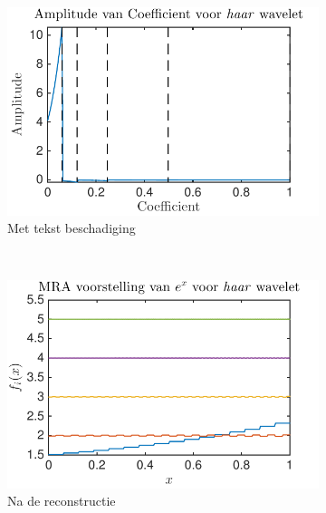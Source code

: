 \begin{figure}
\begin{subfigure}[b]{0.45\textwidth}
        \includegraphics[width=\textwidth]{../src/denoising/haar_noNoise/coef_exp_haar_4}
        \caption{Met tekst beschadiging}
        \label{fig:tiger}
    \end{subfigure}
    ~ %
    \begin{subfigure}[b]{0.45\textwidth}
        \includegraphics[width=\textwidth]{../src/denoising/haar_noNoise/MRA_exp_haar_4}
        \caption{Na de reconstructie}
        \label{fig:mouse}
    \end{subfigure}
    \begin{subfigure}[b]{0.45\textwidth}

\end{subfigure}
\end{figure}
